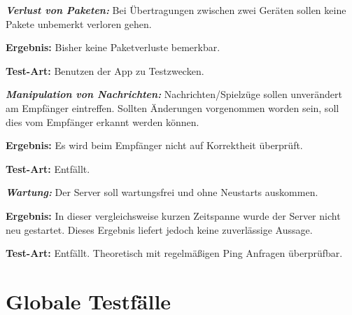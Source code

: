 \documentclass[parskip=full]{scrartcl}
\begin{document}
\begin{description}
	\item[NF1060] \textbf{\textit{Verlust von Paketen: }} Bei Übertragungen zwischen zwei Geräten sollen keine Pakete unbemerkt verloren gehen.
	\item \textbf{Ergebnis: } Bisher keine Paketverluste bemerkbar.
	\item \textbf{Test-Art: } Benutzen der App zu Testzwecken.
	
	\item[NF1070] \textbf{\textit{Manipulation von Nachrichten: }} Nachrichten/Spielzüge sollen unverändert am Empfänger eintreffen. Sollten Änderungen vorgenommen worden sein, soll dies vom Empfänger erkannt werden können.
	\item \textbf{Ergebnis: } Es wird beim Empfänger nicht auf Korrektheit überprüft.
	\item \textbf{Test-Art: } Entfällt.
	
	\item[NF1080] \textbf{\textit{Wartung: }} Der Server soll wartungsfrei und ohne Neustarts auskommen.
	\item \textbf{Ergebnis: } In dieser vergleichsweise kurzen Zeitspanne wurde der Server nicht neu gestartet. Dieses Ergebnis liefert jedoch keine zuverlässige Aussage.
	\item \textbf{Test-Art: } Entfällt. Theoretisch mit regelmäßigen Ping Anfragen überprüfbar.
	
	
\end{description}

\section{Globale Testfälle}
\end{document}
